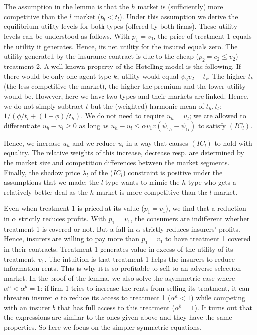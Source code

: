 \documentclass[12pt,english,a4paper]{article}
\begin{document}
The assumption in the lemma is that the \(h\) market is (sufficiently) more competitive than the \(l\) market (\(t_h < t_l\)). Under this assumption we derive the equilibrium utility levels for both types (offered by both firms). These utility levels can be understood as follows. With \(p_1=v_1\), the price of treatment 1 equals the utility it generates. Hence, its net utility for the insured equals zero. The utility generated by the insurance contract is due to the cheap (\(p_2 = c_2 \le v_2\)) treatment 2. A well known property of the Hotelling model is the following.  If there would be only one agent type \(k\), utility would equal \(\psi_2 v_2 -t_k\). The higher \(t_k\) (the less competitive the market), the higher the premium and the lower utility would be. However, here we have two types and their markets are linked. Hence, we do not simply subtract \(t\) but the (weighted) harmonic mean of \(t_h,t_l\): \(1/(\phi/t_l+(1-\phi)/t_h)\). We do not need to require \(u_h=u_l\); we are allowed to differentiate \(u_h-u_l\geq 0\) as long as \(u_h-u_l \leq \alpha v_1 x(\psi_{1h}-\psi_{1l})\) to satisfy \((IC_l)\).

Hence, we increase \(u_h\) and we reduce \(u_l\) in a way that causes \((IC_l)\) to hold with equality. The relative weights of this increase, decrease resp. are determined by the market size and competition differences between the market segments. Finally, the shadow price \(\lambda_l\) of the (\(IC_l\)) constraint is positive under the assumptions that we made: the \(l\) type wants to mimic the \(h\) type who gets a relatively better deal as the \(h\) market is more competitive than the \(l\) market.

Even when treatment 1 is priced at its value (\(p_1=v_1\)), we find that a reduction in \(\alpha\) strictly reduces profits. With \(p_1=v_1\), the consumers are indifferent whether treatment 1 is covered or not. But a fall in \(\alpha\) strictly reduces insurers' profits. Hence, insurers are willing to pay more than \(p_1=v_1\) to have treatment 1 covered in their contracts. Treatment 1 generates value in excess of the utility of its treatment, \(v_1\). The intuition is that treatment 1 helps the insurers to reduce information rents. This is why it is so profitable to sell to an adverse selection market. In the proof of the lemma, we also solve the asymmetric case where \(\alpha^a< \alpha^b =1\): if firm 1 tries to increase the rents from selling its treatment, it can threaten insurer \(a\) to reduce its access to treatment 1 (\(\alpha^a <1\)) while competing with an insurer \(b\) that has full access to this treatment (\(\alpha^b =1\)). It turns out that the expressions are similar to the ones given above and they have the same properties. So here we focus on the simpler symmetric equations.
\end{document}
